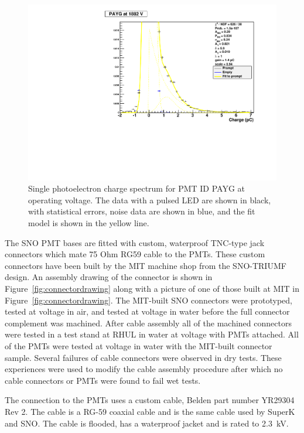 \documentclass{JINST}
\begin{document}
\begin{figure}[ht]
\begin{center}
\includegraphics[width=4.5in]{graphics/PAYG_singlePE.pdf}
\caption{Single photoelectron charge spectrum for PMT ID PAYG at operating voltage.  The data with a pulsed LED are shown in black, with statistical errors, noise data are shown in blue, and the fit model is shown in the yellow line.
\label{fig:pmt_spe_q}}
\end{center}
\end{figure}

The SNO PMT bases are fitted with custom, waterproof TNC-type jack
connectors which mate 75 Ohm RG59 cable to the PMTs.  These custom
connectors have been built by the MIT machine shop from the SNO-TRIUMF
design. An assembly drawing of the connector is shown in
Figure~\ref{fig:connectordrawing} along with a picture of one of those
built at MIT in Figure~\ref{fig:connectordrawing}. The MIT-built SNO
connectors were prototyped, tested at voltage in air, and tested at
voltage in water before the full connector complement was machined.
After cable assembly all of the machined connectors were tested in
a test stand at RHUL in water at voltage with PMTs attached.  All of the
PMTs were tested at voltage in water with the MIT-built connector
sample.  Several failures of cable connectors were observed in dry
tests.  These experiences were used to modify the cable assembly
procedure after which no cable connectors or PMTs were found to fail
wet tests.


The connection to the PMTs uses a custom cable, Belden part number YR29304 Rev 2.  The cable is a
RG-59 coaxial cable and is the same cable used by SuperK and SNO.
The cable is flooded, has a waterproof jacket and is rated to 2.3~kV.
\end{document}
